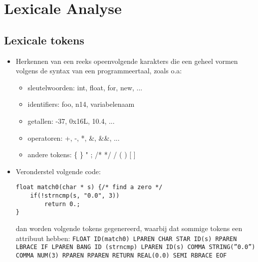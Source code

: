 \chapter{Lexicale Analyse}
\label{ch:lexicale_analyse}
\section{Lexicale tokens}
\begin{itemize}
	\item Herkennen van een reeks opeenvolgende karakters die een geheel vormen volgens de syntax van een programmeertaal, zoals o.a:
	\begin{itemize}
		\item sleutelwoorden: int, float, for, new, ...
		\item identifiers: foo, n14, variabelenaam
		\item getallen: -37, 0x16L, 10.4, ...
		\item operatoren: +, -, *, \&, \&\&, ...
		\item andere tokens: \{ \} " ; /*  */ / ( ) [ ]
	\end{itemize}
	\item Veronderstel volgende code:
	\begin{lstlisting}
float match0(char * s) {/* find a zero */ 
	if(!strncmp(s, "0.0", 3))
		return 0.;
}
	\end{lstlisting}
	dan worden volgende tokens gegenereerd, waarbij dat sommige tokens een {\color{red}attribuut} hebben:
	\texttt{FLOAT ID({\color{red}match0}) LPAREN CHAR STAR ID({\color{red}s}) RPAREN LBRACE IF LPAREN BANG ID ({\color{red}strncmp}) LPAREN ID({\color{red}s}) COMMA STRING({\color{red}''0.0''}) COMMA NUM({\color{red}3}) RPAREN RPAREN  RETURN REAL({\color{red}0.0}) SEMI RBRACE EOF}
	\end{itemize}
